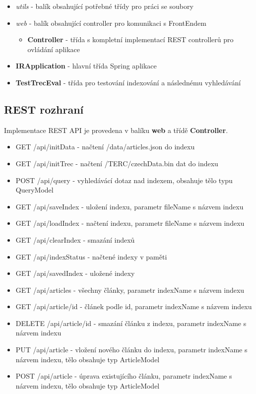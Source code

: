 \documentclass[
12pt,
a4paper,
pdftex,
czech,
titlepage
]{report}
\begin{document}
\begin{itemize}
    \item \textit{utils} - balík obsahující potřebné třídy pro práci se soubory
    \item \textit{web} - balík obsahující controller pro komunikaci s FrontEndem
    \begin{itemize}
        \item \textbf{Controller} - třída s kompletní implementací REST controllerů pro ovládání aplikace
    \end{itemize}
    \item \textbf{IRApplication} - hlavní třída Spring aplikace
    \item \textbf{TestTrecEval} - třída pro testování indexování a následnému vyhledávání
\end{itemize}
\subsection{REST rozhraní}
Implementace REST API je provedena v balíku \textbf{web} a třídě \textbf{Controller}.
\begin{itemize}
    \item GET /api/initData - načtení /data/articles.json do indexu
    \item GET /api/initTrec - načtení /TERC/czechData.bin dat do indexu
    \item POST /api/query - vyhledávácí dotaz nad indexem, obsahuje tělo typu QueryModel
    \item GET /api/saveIndex - uložení indexu, parametr fileName s názvem indexu
    \item GET /api/loadIndex - načtení indexu, parametr fileName s názvem indexu
    \item GET /api/clearIndex - smazání indexů
    \item GET /api/indexStatus - načtené indexy v paměti
    \item GET /api/savedIndex - uložené indexy
    \item GET /api/articles - všechny články, parametr indexName s názvem indexu
    \item GET /api/article/{id} - článek podle id, parametr indexName s názvem indexu
    \item DELETE /api/article/{id} - smazání článku z indexu, parametr indexName s názvem indexu
    \item PUT /api/article - vložení nového článku do indexu, parametr indexName s názvem indexu, tělo obsahuje typ ArticleModel
    \item POST /api/article - úprava existujícího článku, parametr indexName s názvem indexu, tělo obsahuje typ ArticleModel
\end{itemize}
\end{document}
